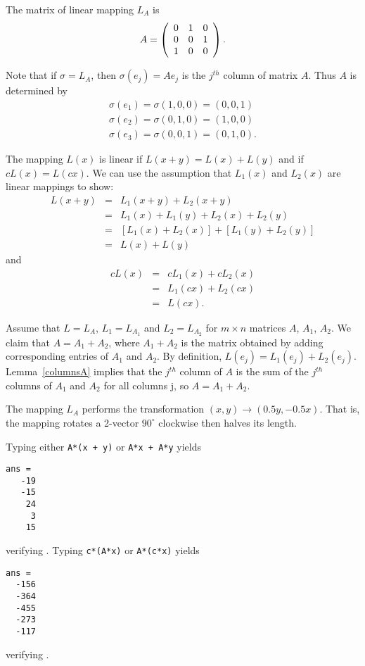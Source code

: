\documentclass{ximera}
\begin{document}
\ans The matrix of linear mapping $L_A$ is
\[ A = \left(\begin{array}{rrr} 0 & 1 & 0 \\ 0 & 0 & 1 \\ 1 & 0 & 0\end{array}\right). \]

\soln Note that if $\sigma = L_A$, then $\sigma(e_j) = Ae_j$ is the
$j^{th}$ column of matrix $A$.  Thus $A$ is determined by
\[
\begin{array}{l}
\sigma(e_1) = \sigma(1,0,0) = (0,0,1) \\
\sigma(e_2) = \sigma(0,1,0) = (1,0,0) \\
\sigma(e_3) = \sigma(0,0,1) = (0,1,0). \end{array}
\]

The mapping $L(x)$ is linear if $L(x + y) = L(x) + L(y)$ and
if $cL(x) = L(cx)$.  We can use the assumption that $L_1(x)$
and $L_2(x)$ are linear mappings to show:
\[ \begin{array}{rcl}
L(x + y) & = & L_1(x + y) + L_2(x + y) \\
& = & L_1(x) + L_1(y) + L_2(x) + L_2(y) \\
& = & [L_1(x) + L_2(x)] + [L_1(y) + L_2(y)] \\
& = & L(x) + L(y) \end{array} \]
and
\[ \begin{array}{rcl}
cL(x) & = & cL_1(x) + cL_2(x) \\
& = & L_1(cx) + L_2(cx) \\
& = & L(cx). \end{array} \]

Assume that $L = L_A$, $L_1 = L_{A_1}$ and $L_2 = L_{A_2}$ for
$m \times n$ matrices $A$, $A_1$, $A_2$.  We claim that
$A = A_1 + A_2$, where $A_1 + A_2$ is the matrix obtained by
adding corresponding entries of $A_1$ and $A_2$.  By
definition, $L(e_j) = L_1(e_j) + L_2(e_j)$.  Lemma~\ref{columnsA}
implies that the $j^{th}$ column of $A$ is the sum of the
$j^{th}$ columns of $A_1$ and $A_2$ for all columns {j}, so
$A = A_1 + A_2$.

The mapping $L_A$ performs the transformation $(x,y) \rightarrow
(0.5y, -0.5x)$.  That is, the mapping rotates a 2-vector
$90^\circ$ clockwise then halves its length.

 Typing either {\tt A*(x + y)} or {\tt A*x + A*y} yields
\begin{verbatim}
ans =
   -19
   -15
    24
     3
    15
\end{verbatim}
verifying .  Typing {\tt c*(A*x)} or {\tt A*(c*x)} yields
\begin{verbatim}
ans =
  -156
  -364
  -455
  -273
  -117
\end{verbatim}
verifying .
\end{document}
